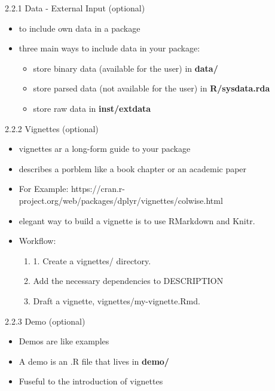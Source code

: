 \documentclass[11pt,a4paper]{beamer}
\begin{document}
\begin{frame}[t]{2.2.1 Data - External Input (optional)}
	
	\begin{itemize}
		\item to	include	own data	in	a	package
		\item three	main	ways	to	include	data	in	your	package:
		\begin{itemize}
			\item store	binary	data (available for the user) in \textbf{data/}
			\item store	parsed	data (not available for the user) in
			\textbf{R/sysdata.rda}
			\item store	raw	data in	\textbf{inst/extdata}
		\end{itemize}

	\end{itemize}
	
\end{frame}






\begin{frame}[t]{2.2.2 Vignettes (optional)}
	
	\begin{itemize}
		\item  vignettes ar a long-form guide to your package
		\item  describes a porblem like a book	chapter	or	an	academic paper
		\item For Example: https://cran.r-project.org/web/packages/dplyr/vignettes/colwise.html
		\item elegant way to build a vignette is to use RMarkdown and Knitr.  
		\item Workflow: 
				
		\begin{enumerate}
			\item 1.	Create	a	vignettes/	directory.
			\item Add	the	necessary	dependencies	to	DESCRIPTION
			\item Draft	a	vignette,	vignettes/my-vignette.Rmd.
		\end{enumerate}
		
	\end{itemize}
	
\end{frame}




\begin{frame}[t]{2.2.3 Demo (optional)}
	
	\begin{itemize}
		\item Demos	are	like	examples
		\item A	demo is	an .R file that	lives in \textbf{demo/}
		\item Fuseful to the introduction of vignettes
	
		
	\end{itemize}
	
\end{frame}
\end{document}

